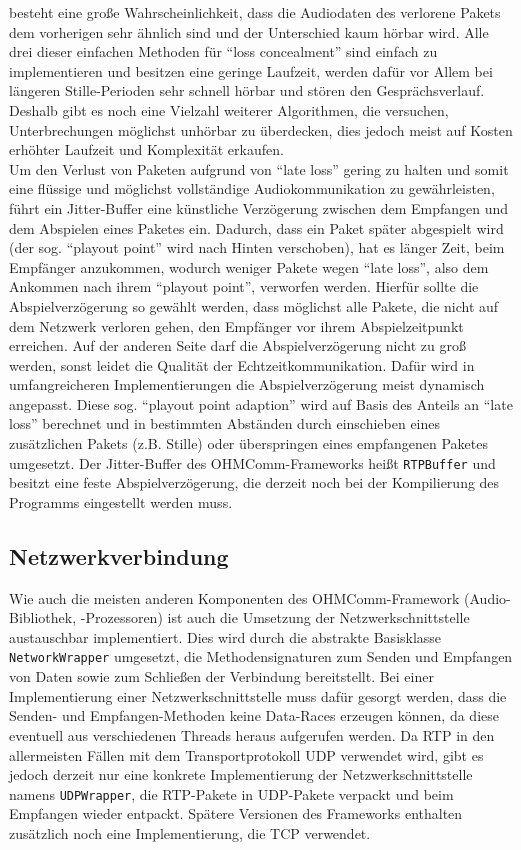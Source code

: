 besteht eine große Wahrscheinlichkeit, dass die Audiodaten des verlorene Pakets dem vorherigen sehr ähnlich sind und der Unterschied kaum hörbar wird. Alle drei dieser einfachen Methoden für \enquote{loss concealment} sind einfach zu implementieren und besitzen eine geringe Laufzeit, werden dafür vor Allem bei längeren Stille-Perioden sehr schnell hörbar und stören den Gesprächsverlauf. Deshalb gibt es noch eine Vielzahl weiterer Algorithmen, die versuchen, Unterbrechungen möglichst unhörbar zu überdecken, dies jedoch meist auf Kosten erhöhter Laufzeit und Komplexität erkaufen.
\\
Um den Verlust von Paketen aufgrund von \enquote{late loss} gering zu halten und somit eine flüssige und möglichst vollständige Audiokommunikation zu gewährleisten, führt ein Jitter-Buffer eine künstliche Verzögerung zwischen dem Empfangen und dem Abspielen eines Paketes ein. Dadurch, dass ein Paket später abgespielt wird (der sog. \enquote{playout point} wird nach Hinten verschoben), hat es länger Zeit, beim Empfänger anzukommen, wodurch weniger Pakete wegen \enquote{late loss}, also dem Ankommen nach ihrem \enquote{playout point}, verworfen werden. Hierfür sollte die Abspielverzögerung so gewählt werden, dass möglichst alle Pakete, die nicht auf dem Netzwerk verloren gehen, den Empfänger vor ihrem Abspielzeitpunkt erreichen. Auf der anderen Seite darf die Abspielverzögerung nicht zu groß werden, sonst leidet die Qualität der Echtzeitkommunikation. Dafür wird in umfangreicheren Implementierungen die Abspielverzögerung meist dynamisch angepasst. Diese sog. \enquote{playout point adaption} wird auf Basis des Anteils an \enquote{late loss} berechnet und in bestimmten Abständen durch einschieben eines zusätzlichen Pakets (z.B. Stille) oder überspringen eines empfangenen Paketes umgesetzt. Der Jitter-Buffer des OHMComm-Frameworks heißt \texttt{RTPBuffer} und besitzt eine feste Abspielverzögerung, die derzeit noch bei der Kompilierung des Programms eingestellt werden muss.
\subsection{Netzwerkverbindung}
Wie auch die meisten anderen Komponenten des OHMComm-Framework (Audio-Bibliothek, -Prozessoren) ist auch die Umsetzung der Netzwerkschnittstelle austauschbar implementiert. Dies wird durch die abstrakte Basisklasse \texttt{NetworkWrapper} umgesetzt, die Methodensignaturen zum Senden und Empfangen von Daten sowie zum Schließen der Verbindung bereitstellt. Bei einer Implementierung einer Netzwerkschnittstelle muss dafür gesorgt werden, dass die Senden- und Empfangen-Methoden keine Data-Races erzeugen können, da diese eventuell aus verschiedenen Threads heraus aufgerufen werden. Da RTP in den allermeisten Fällen mit dem Transportprotokoll UDP verwendet wird, gibt es jedoch derzeit nur eine konkrete Implementierung der Netzwerkschnittstelle namens \texttt{UDPWrapper}, die RTP-Pakete in UDP-Pakete verpackt und beim Empfangen wieder entpackt. Spätere Versionen des Frameworks enthalten zusätzlich noch eine Implementierung, die TCP verwendet.

